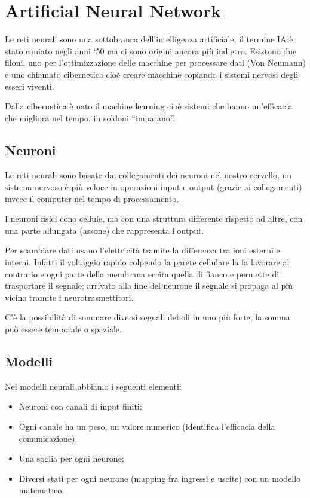 \section{Artificial Neural Network}\label{artificial-neural-network}

Le reti neurali sono una sottobranca dell'intelligenza artificiale, il
termine IA è stato coniato negli anni `50 ma ci sono origini ancora più
indietro. Esistono due filoni, uno per l'ottimizzazione delle macchine
per processare dati (Von Neumann) e uno chiamato cibernetica cioè creare
macchine copiando i sistemi nervosi degli esseri viventi.

Dalla cibernetica è nato il machine learning cioè sistemi che hanno
un'efficacia che migliora nel tempo, in soldoni ``imparano''.

\subsection{Neuroni}\label{neuroni}

Le reti neurali sono basate dai collegamenti dei neuroni nel nostro
cervello, un sistema nervoso è più veloce in operazioni input e output
(grazie ai collegamenti) invece il computer nel tempo di processamento.

I neuroni fisici cono cellule, ma con una struttura differente rispetto
ad altre, con una parte allungata (assone) che rappresenta l'output.

Per scambiare dati usano l'elettricità tramite la differenza tra ioni
esterni e interni. Infatti il voltaggio rapido colpendo la parete
cellulare la fa lavorare al contrario e ogni parte della membrana eccita
quella di fianco e permette di trasportare il segnale; arrivato alla
fine del neurone il segnale si propaga al più vicino tramite i
neurotrasmettitori.

C'è la possibilità di sommare diversi segnali deboli in uno più forte,
la somma può essere temporale o spaziale.

\subsection{Modelli}\label{modelli}

Nei modelli neurali abbiamo i seguenti elementi:

\begin{itemize}
\item
  Neuroni con canali di input finiti;
\item
  Ogni canale ha un peso, un valore numerico (identifica l'efficacia
  della comunicazione);
\item
  Una soglia per ogni neurone;
\item
  Diversi stati per ogni neurone (mapping fra ingressi e uscite) con un
  modello matematico.
\end{itemize}

